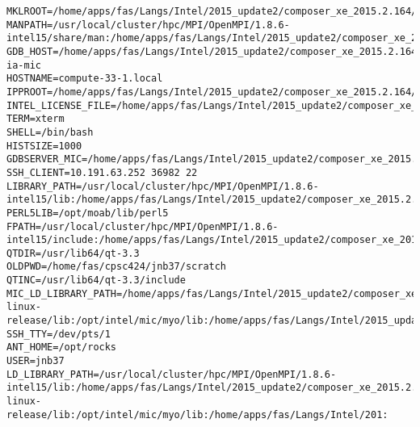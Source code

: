 \documentclass[11pt]{article}
\begin{document}
\begin{verbatim}
MKLROOT=/home/apps/fas/Langs/Intel/2015_update2/composer_xe_2015.2.164/mkl
MANPATH=/usr/local/cluster/hpc/MPI/OpenMPI/1.8.6-intel15/share/man:/home/apps/fas/Langs/Intel/2015_update2/composer_xe_2015.2.164/man/en_US:/home/apps/fas/Langs/Intel/2015_update2/composer_xe_2015.2.164/debugger/gdb/intel64/share/man/:/home/apps/fas/Langs/Intel/2015_update2/composer_xe_2015.2.164/debugger/gdb/intel64_mic/share/man/:/usr/share/man:/opt/moab/share/man:
GDB_HOST=/home/apps/fas/Langs/Intel/2015_update2/composer_xe_2015.2.164/debugger/gdb/intel64_mic/bin/gdb-ia-mic
HOSTNAME=compute-33-1.local
IPPROOT=/home/apps/fas/Langs/Intel/2015_update2/composer_xe_2015.2.164/ipp
INTEL_LICENSE_FILE=/home/apps/fas/Langs/Intel/2015_update2/composer_xe_2015.2.164/licenses:/opt/intel/licenses:/home/apps/fas/Licenses/intel_site.lic
TERM=xterm
SHELL=/bin/bash
HISTSIZE=1000
GDBSERVER_MIC=/home/apps/fas/Langs/Intel/2015_update2/composer_xe_2015.2.164/debugger/gdb/target/mic/bin/gdbserver
SSH_CLIENT=10.191.63.252 36982 22
LIBRARY_PATH=/usr/local/cluster/hpc/MPI/OpenMPI/1.8.6-intel15/lib:/home/apps/fas/Langs/Intel/2015_update2/composer_xe_2015.2.164/ipp/../compiler/lib/intel64:/home/apps/fas/Langs/Intel/2015_update2/composer_xe_2015.2.164/ipp/lib/intel64:/home/apps/fas/Langs/Intel/2015_update2/composer_xe_2015.2.164/compiler/lib/intel64:/home/apps/fas/Langs/Intel/2015_update2/composer_xe_2015.2.164/mkl/lib/intel64:/home/apps/fas/Langs/Intel/2015_update2/composer_xe_2015.2.164/tbb/lib/intel64/gcc4.4
PERL5LIB=/opt/moab/lib/perl5
FPATH=/usr/local/cluster/hpc/MPI/OpenMPI/1.8.6-intel15/include:/home/apps/fas/Langs/Intel/2015_update2/composer_xe_2015.2.164/mkl/include
QTDIR=/usr/lib64/qt-3.3
OLDPWD=/home/fas/cpsc424/jnb37/scratch
QTINC=/usr/lib64/qt-3.3/include
MIC_LD_LIBRARY_PATH=/home/apps/fas/Langs/Intel/2015_update2/composer_xe_2015.2.164/mpirt/lib/mic:/home/apps/fas/Langs/Intel/2015_update2/composer_xe_2015.2.164/ipp/lib/mic:/home/apps/fas/Langs/Intel/2015_update2/composer_xe_2015.2.164/compiler/lib/mic:/home/apps/fas/Langs/Intel/2015_update2/composer_xe_2015.2.164/mkl/lib/mic:/opt/intel/mic/coi/device-linux-release/lib:/opt/intel/mic/myo/lib:/home/apps/fas/Langs/Intel/2015_update2/composer_xe_2015.2.164/tbb/lib/mic
SSH_TTY=/dev/pts/1
ANT_HOME=/opt/rocks
USER=jnb37
LD_LIBRARY_PATH=/usr/local/cluster/hpc/MPI/OpenMPI/1.8.6-intel15/lib:/home/apps/fas/Langs/Intel/2015_update2/composer_xe_2015.2.164/mpirt/lib/intel64:/home/apps/fas/Langs/Intel/2015_update2/composer_xe_2015.2.164/ipp/../compiler/lib/intel64:/home/apps/fas/Langs/Intel/2015_update2/composer_xe_2015.2.164/ipp/lib/intel64:/home/apps/fas/Langs/Intel/2015_update2/composer_xe_2015.2.164/ipp/tools/intel64/perfsys:/opt/intel/mic/coi/host-linux-release/lib:/opt/intel/mic/myo/lib:/home/apps/fas/Langs/Intel/201:

\end{verbatim}
\end{document}
